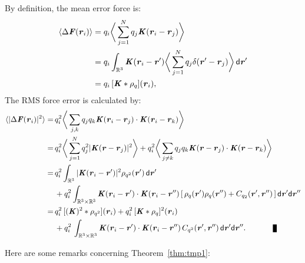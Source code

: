 \documentclass[aps,pre,preprint]{revtex4}
\renewcommand{\v}[1]{\textbf{\textit{#1}}}
\renewcommand{\d}[1]{\textsf{#1}}
\newenvironment{proof}[1][Proof]{\begin{trivlist}
\item[\hskip \labelsep {\bfseries #1}]}{\end{trivlist}}
\newcommand{\qed}{\nobreak \ifvmode \relax \else
      \ifdim\lastskip<1.5em \hskip-\lastskip
      \hskip1.5em plus0em minus0.5em \fi \nobreak
      \vrule height0.75em width0.5em depth0.25em\fi}
\begin{document}
\begin{proof}
  By definition, the mean error force is:
  \begin{align*}
    \langle\Delta\v F(\v r_i)\rangle
    &=
    q_i\bigg\langle \sum_{j=1}^Nq_j\v K(\v r_i -\v r_j)\bigg\rangle\\
    &=
    q_i\int_{\mathbb R^3}\v K(\v r_i - \v r')
    \bigg\langle \sum_{j=1}^Nq_j\delta (\v r' -\v r_j)\bigg\rangle
    \,\d d\v r'\\
    &= 
    q_i\, [\v K\ast\rho_q](\v r_i),
  \end{align*}
  The RMS force error is calculated by:
  \begin{align*} \nonumber
    \langle\vert\Delta\v F(\v r_i)\vert^2\rangle
    =\,&
    q_i^2\bigg\langle\sum_{j,k}
    q_jq_k\v K(\v r_i - \v r_j)\cdot\v K(\v r_i - \v r_k)\bigg\rangle \\ \nonumber
    =\,&
    q_i^2\bigg\langle\sum_{j=1}^N
    q_j^2\vert\v K(\v r - \v r_j)\vert^2
    \bigg\rangle +
    q_i^2\bigg\langle\sum_{j\neq k}
    q_jq_k \v K(\v r - \v r_j)\cdot\v K(\v r - \v r_k)
    \bigg\rangle \\ \nonumber
    =\,&
    q_i^2\int_{\mathbb R^3}
    \vert\v K(\v r_i - \v r')\vert^2\rho_{q^2}(\v r')\,\d d\v r'
    \\
    & +
    q_i^2\int_{\mathbb R^3\times\mathbb R^3}
    \v K(\v r_i - \v r')\cdot\v K(\v r_i - \v r'')\,
    [\,\rho_q(\v r')\rho_q(\v r'') + C_{q_2}(\v r',\v r'')\,]
    \,\d d\v r'\d d\v r''\\
    = \,&
    q_i^2\,[(\v K)^2\ast\rho_{q^2}] (\v r_i) + 
    q_i^2\,[\v K\ast\rho_{q}]^2 (\v r_i) \\
    &+
    q_i^2\,\int_{\mathbb R^3\times\mathbb R^3}
    \v K(\v r_i-\v r')\cdot
    \v K(\v r_i-\v r'')\,
    C_{q^2}(\v r', \v r'')\,
    \d d\v r'\d d\v r''. \qquad\qed
  \end{align*}
\end{proof}
Here are some remarks concerning Theorem~\ref{thm:tmp1}:
\end{document}
